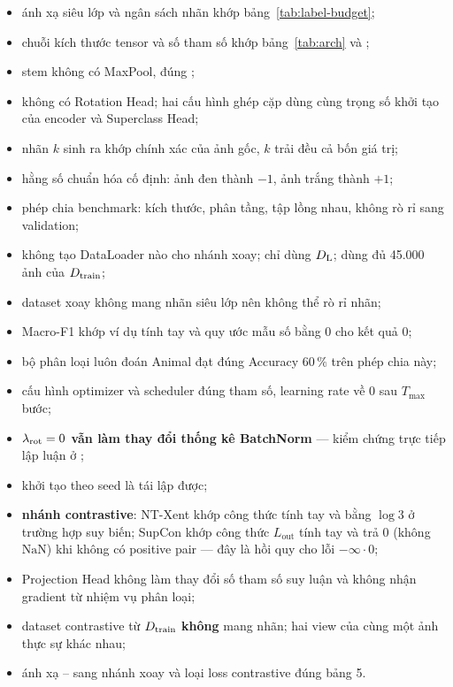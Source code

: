 \begin{itemize}[leftmargin=1.2cm,itemsep=2pt]
  \item ánh xạ siêu lớp và ngân sách nhãn khớp bảng~\ref{tab:label-budget};
  \item chuỗi kích thước tensor và số tham số khớp bảng~\ref{tab:arch} và
        ;
  \item stem không có MaxPool, đúng ;
  \item {} không có Rotation Head; hai cấu hình ghép cặp dùng cùng trọng số khởi tạo của
        encoder và Superclass Head;
  \item nhãn $k$ sinh ra khớp chính xác  của ảnh gốc, $k$ trải đều cả bốn giá
        trị;
  \item hằng số chuẩn hóa cố định: ảnh đen thành $-1$, ảnh trắng thành $+1$;
  \item phép chia benchmark: kích thước, phân tầng, tập lồng nhau, không rò rỉ sang validation;
  \item {} không tạo DataLoader nào cho nhánh xoay;  chỉ dùng $D_{\mathrm{L}}$;  dùng
        đủ 45.000 ảnh của $D_{\mathrm{train}}$;
  \item dataset xoay không mang nhãn siêu lớp nên không thể rò rỉ nhãn;
  \item Macro-F1 khớp ví dụ tính tay và quy ước mẫu số bằng $0$ cho kết quả $0$;
  \item bộ phân loại luôn đoán Animal đạt đúng Accuracy $60\,\%$ trên phép chia này;
  \item cấu hình optimizer và scheduler đúng tham số, learning rate về $0$ sau $T_{\max}$ bước;
  \item \textbf{$\lambda_{\mathrm{rot}} = 0$ vẫn làm thay đổi thống kê BatchNorm} — kiểm chứng trực tiếp lập luận
        ở ;
  \item khởi tạo theo seed là tái lập được;
  \item \textbf{nhánh contrastive}: NT-Xent khớp công thức tính tay và bằng $\log 3$ ở trường
        hợp suy biến; SupCon khớp công thức $L_{\mathrm{out}}$ tính tay và trả $0$ (không
        $\mathrm{NaN}$) khi không có positive pair — đây là hồi quy cho lỗi $-\infty \cdot 0$;
  \item Projection Head không làm thay đổi số tham số suy luận và không nhận gradient từ
        nhiệm vụ phân loại;
  \item dataset contrastive từ $D_{\mathrm{train}}$ \textbf{không} mang nhãn; hai view của cùng một ảnh
        thực sự khác nhau;
  \item ánh xạ -- sang nhánh xoay và loại loss contrastive đúng bảng 5.
\end{itemize}

